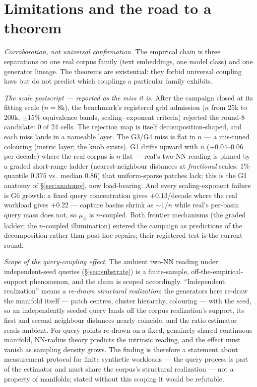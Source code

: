 \documentclass[11pt]{article}
\newcommand{\muQ}{\mu_{\mathcal{Q}}}
\begin{document}
\section{Limitations and the road to a theorem}\label{sec:limits}

\emph{Corroboration, not universal confirmation.} The empirical chain is
three separations on one real corpus family (text embeddings, one model
class) and one generator lineage. The theorems are existential: they forbid
universal coupling laws but do not predict which couplings a particular
family exhibits.

\emph{The scale postscript --- reported as the miss it is.} After the
campaign closed at its fitting scale ($n=8$k), the benchmark's registered
grid admission ($n$ from 25k to 200k, $\pm15\%$ equivalence bands, scaling-
exponent criteria) rejected the round-8 candidate: 0 of 24 cells. The
rejection map is itself decomposition-shaped, and each miss lands in a
nameable layer. The G3/G4 miss is flat in $n$ --- a mis-tuned colouring
(metric layer; the knob exists). G1 drifts upward with $n$ ($+0.04$--$0.06$
per decade) where the real corpus is $n$-flat --- real's two-NN reading is
pinned by a graded short-range ladder (nearest-neighbour distances at
\emph{fractional} scales: 1\%-quantile $0.375$ vs.\ median $0.86$) that
uniform-sparse patches lack; this is the G1 anatomy of \S\ref{sec:anatomy},
now load-bearing. And every scaling-exponent failure is G6 growth: a fixed
query concentration gives $+0.13$/decade where the real workload gives
$+0.22$ --- capture basins shrink as ${\sim}1/n$ while real's per-basin
query mass does not, so $\muQ$ is $n$-coupled. Both frontier mechanisms
(the graded ladder; the $n$-coupled illumination) entered the campaign as
predictions of the decomposition rather than post-hoc repairs; their
registered test is the current round.

\emph{Scope of the query-coupling effect.} The ambient two-NN reading under
independent-seed queries (\S\ref{sec:substrate}) is a finite-sample,
off-the-empirical-support phenomenon, and the claim is scoped accordingly.
``Independent realization'' means a \emph{re-drawn structural realization}:
the generators here re-draw the manifold itself --- patch centres, cluster
hierarchy, colouring --- with the seed, so an independently seeded query
lands off the corpus realization's support, its first and second neighbour
distances nearly coincide, and the ratio estimator reads ambient. For query
points re-drawn on a fixed, genuinely shared continuous manifold, NN-radius
theory predicts the intrinsic reading, and the effect must vanish as
sampling density grows. The finding is therefore a statement about
measurement protocol for finite synthetic workloads --- the query process
is part of the estimator and must share the corpus's structural
realization --- not a property of manifolds; stated without this scoping it
would be refutable.
\end{document}
